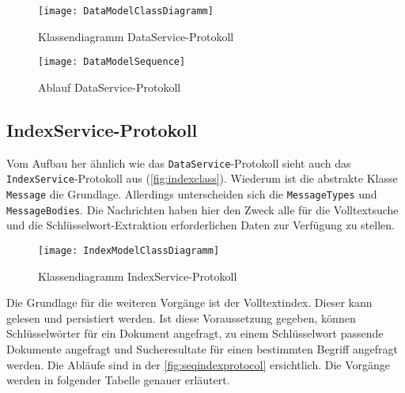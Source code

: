     \begin{figure}[H]
    \centering
    \texttt{[image: DataModelClassDiagramm]}
    \caption{Klassendiagramm DataService-Protokoll}
    \label{fig:dataclass}
    \end{figure}

    \begin{figure}[H]
    \centering
    \texttt{[image: DataModelSequence]}
    \caption{Ablauf DataService-Protokoll}
    \label{fig:seqdataprotocol}
    \end{figure}


\subsection{IndexService-Protokoll}

Vom Aufbau her ähnlich wie das \texttt{DataService}-Protokoll sieht auch das \texttt{IndexService}-Protokoll aus (\autoref{fig:indexclass}). Wiederum ist die abstrakte Klasse \texttt{Message} die Grundlage. Allerdings unterscheiden sich die \texttt{Mes\-sa\-ge\-Typ\-es} und \texttt{MessageBodies}. Die Nachrichten haben hier den Zweck alle für die Volltextsuche und die Schlüs\-sel\-wort-\-Ex\-trak\-tion erforderlichen Daten zur Verfügung zu stellen.

    
    \begin{figure}[H]
    \centering
    \texttt{[image: IndexModelClassDiagramm]}
    \caption{Klassendiagramm IndexService-Protokoll}
    \label{fig:indexclass}
    \end{figure}

Die Grundlage für die weiteren Vorgänge ist der Volltextindex. Dieser kann gelesen und persistiert werden. Ist diese Voraussetzung gegeben, können Schlüsselwörter für ein Dokument angefragt, zu einem Schlüsselwort passende Dokumente angefragt und Sucheresultate für einen bestimmten Begriff angefragt werden. Die Abläufe sind in der \autoref{fig:seqindexprotocol} ersichtlich. Die Vorgänge werden in folgender Tabelle genauer erläutert.

